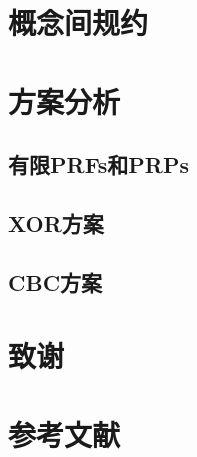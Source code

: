 \documentclass[]{article}
\begin{document}
\section{概念间规约}

\section{方案分析}

\subsection{有限PRFs和PRPs}

\subsection{XOR方案}

\subsection{CBC方案}

\section*{致谢}

\section*{参考文献}
\end{document}
